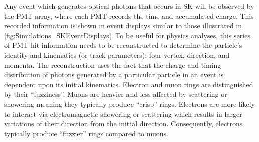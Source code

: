 Any event which generates optical photons that occurs in SK will be observed by the PMT array, where each PMT records the time and accumulated charge. This recorded information is shown in event displays similar to those illustrated in \autoref{fig:Simulations_SKEventDisplays}. To be useful for physics analyses, this series of PMT hit information needs to be reconstructed to determine the particle's identity and kinematics (or track parameters): four-vertex, direction, and momenta. The reconstruction uses the fact that the charge and timing distribution of photons generated by a particular particle in an event is dependent upon its initial kinematics. Electron and muon rings are distinguished by their ``fuzziness''. Muons are heavier and less affected by scattering or showering meaning they typically produce ``crisp'' rings. Electrons are more likely to interact via electromagnetic showering or scattering which results in larger variations of their direction from the initial direction. Consequently, electrons typically produce ``fuzzier'' rings compared to muons. 

